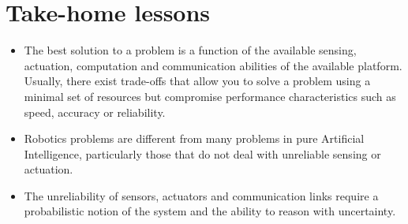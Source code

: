 


\section*{Take-home lessons}
\begin{itemize}
\item The best solution to a problem is a function of the available sensing, actuation, computation and communication abilities of the available platform. Usually, there exist trade-offs that allow you to solve a problem using a minimal set of resources but compromise performance characteristics such as speed, accuracy or reliability.
\item Robotics problems are different from many problems in pure Artificial Intelligence, particularly those that do not deal with unreliable sensing or actuation.
\item The unreliability of sensors, actuators and communication links require a probabilistic notion of the system and the ability to reason with uncertainty.
\end{itemize}

